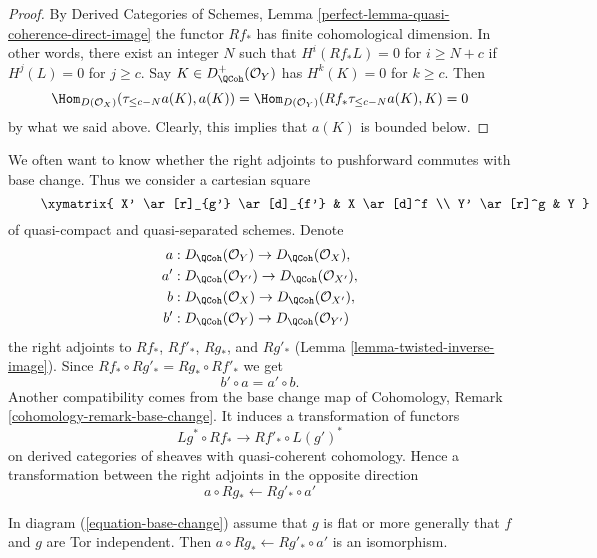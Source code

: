 \begin{proof}
By Derived Categories of Schemes, Lemma
\ref{perfect-lemma-quasi-coherence-direct-image}
the functor $Rf_*$ has finite cohomological dimension. In other words,
there exist an integer $N$ such that
$H^i(Rf_*L) = 0$ for $i \geq N + c$ if $H^j(L) = 0$ for $j \geq c$.
Say $K \in D^+_\QCoh(\mathcal{O}_Y)$ has $H^k(K) = 0$ for $k \geq c$.
Then
$$
\Hom_{D(\mathcal{O}_X)}(\tau_{\leq c - N}a(K), a(K)) =
\Hom_{D(\mathcal{O}_Y)}(Rf_*\tau_{\leq c - N}a(K), K) = 0
$$
by what we said above. Clearly, this implies that $a(K)$ is bounded below.
\end{proof}

\noindent
We often want to know whether the right adjoints to pushforward commutes
with base change. Thus we consider a cartesian square
\begin{equation}
\label{equation-base-change}
\vcenter{
\xymatrix{
X' \ar[r]_{g'} \ar[d]_{f'} & X \ar[d]^f \\
Y' \ar[r]^g & Y
}
}
\end{equation}
of quasi-compact and quasi-separated schemes.
Denote
\begin{align*}
a  & : D_\QCoh(\mathcal{O}_Y) \to D_\QCoh(\mathcal{O}_X), \\
a' & : D_\QCoh(\mathcal{O}_{Y'}) \to D_\QCoh(\mathcal{O}_{X'}), \\
b  & : D_\QCoh(\mathcal{O}_X) \to D_\QCoh(\mathcal{O}_{X'}), \\
b' & : D_\QCoh(\mathcal{O}_Y) \to D_\QCoh(\mathcal{O}_{Y'})
\end{align*}
the right adjoints to $Rf_*$, $Rf'_*$, $Rg_*$, and $Rg'_*$
(Lemma \ref{lemma-twisted-inverse-image}). Since
$Rf_* \circ Rg'_* = Rg_* \circ Rf'_*$ we get
$$
b' \circ a = a' \circ b.
$$
Another compatibility comes from the base change map of
Cohomology, Remark \ref{cohomology-remark-base-change}.
It induces a transformation of functors
$$
Lg^* \circ Rf_* \longrightarrow Rf'_* \circ L(g')^*
$$
on derived categories of sheaves with quasi-coherent cohomology.
Hence a transformation between the right adjoints in the opposite direction
$$
a \circ Rg_* \longleftarrow Rg'_* \circ a'
$$

\begin{lemma}
\label{lemma-flat-precompose-pus}
In diagram (\ref{equation-base-change}) assume that $g$ is flat or
more generally that $f$ and $g$ are Tor independent. Then
$a \circ Rg_* \leftarrow Rg'_* \circ a'$ is an isomorphism.
\end{lemma}

